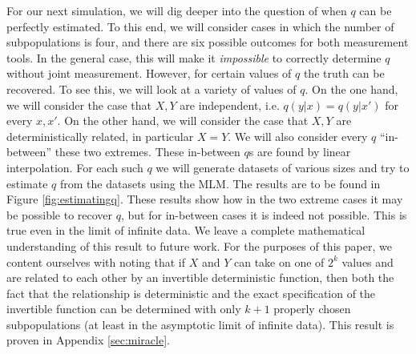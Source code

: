 For our next simulation, we will dig deeper into the question of when $q$ can be perfectly estimated.  To this end, we will consider cases in which the number of subpopulations is four, and there are six possible outcomes for both measurement tools.  In the general case, this will make it \emph{impossible} to correctly determine $q$ without joint measurement.  However, for certain values of $q$ the truth can be recovered.  To see this, we will look at a variety of values of $q$.  On the one hand, we will consider the case that $X,Y$ are independent, i.e. $q(y|x)=q(y|x')$ for every $x,x'$.  On the other hand, we will consider the case that $X,Y$ are deterministically related, in particular $X=Y$.  We will also consider every $q$ ``in-between'' these two extremes.  These in-between $q$s are found by linear interpolation.  For each such $q$ we will generate datasets of various sizes and try to estimate $q$ from the datasets using the MLM.  The results are to be found in Figure \ref{fig:estimatingq}.  These results show how in the two extreme cases it may be possible to recover $q$, but for in-between cases it is indeed not possible.  This is true even in the limit of infinite data.  We leave a complete mathematical understanding of this result to future work.  For the purposes of this paper, we content ourselves with noting that if $X$ and $Y$ can take on one of $2^k$ values and are related to each other by an invertible deterministic function, then both the fact that the relationship is deterministic and the exact specification of the invertible function can be determined with only $k+1$ properly chosen subpopulations (at least in the asymptotic limit of infinite data).  This result is proven in Appendix \ref{sec:miracle}.




